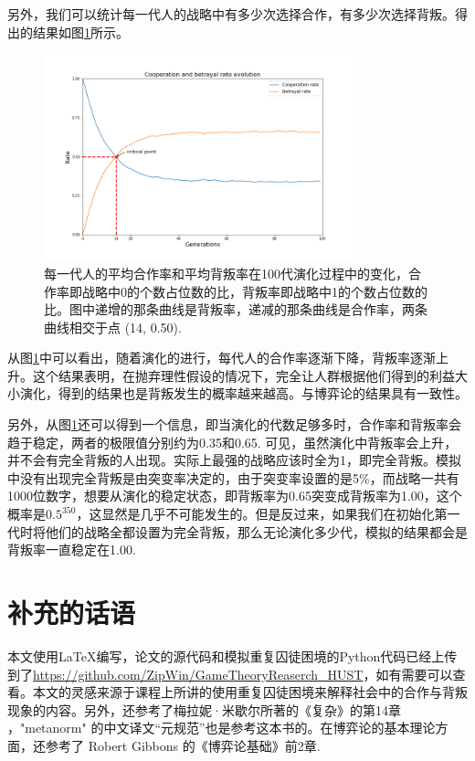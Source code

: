 \documentclass[lang=cn,11pt]{elegantpaper}
\begin{document}
另外，我们可以统计每一代人的战略中有多少次选择合作，有多少次选择背叛。得出的结果如图\ref{fig:cooperation}所示。
\begin{figure}[!htb]
	\centering
	\includegraphics[width=0.8\textwidth]{figure/cooperation.png}
	\caption{ 每一代人的平均合作率和平均背叛率在100代演化过程中的变化，合作率即战略中0的个数占位数的比，背叛率即战略中1的个数占位数的比。图中递增的那条曲线是背叛率，递减的那条曲线是合作率，两条曲线相交于点 (14, 0.50).\label{fig:cooperation}}
\end{figure}
从图\ref{fig:cooperation}中可以看出，随着演化的进行，每代人的合作率逐渐下降，背叛率逐渐上升。这个结果表明，在抛弃理性假设的情况下，完全让人群根据他们得到的利益大小演化，得到的结果也是背叛发生的概率越来越高。与博弈论的结果具有一致性。

另外，从图\ref{fig:cooperation}还可以得到一个信息，即当演化的代数足够多时，合作率和背叛率会趋于稳定，两者的极限值分别约为0.35和0.65. 可见，虽然演化中背叛率会上升，并不会有完全背叛的人出现。实际上最强的战略应该时全为1，即完全背叛。模拟中没有出现完全背叛是由突变率决定的，由于突变率设置的是5\%，而战略一共有1000位数字，想要从演化的稳定状态，即背叛率为0.65突变成背叛率为1.00，这个概率是$0.5^{350}$，这显然是几乎不可能发生的。但是反过来，如果我们在初始化第一代时将他们的战略全都设置为完全背叛，那么无论演化多少代，模拟的结果都会是背叛率一直稳定在1.00.

\section*{补充的话语}
本文使用\LaTeX 编写，论文的源代码和模拟重复囚徒困境的Python代码已经上传到了\url{https://github.com/ZipWin/GameTheoryReaserch\_HUST}，如有需要可以查看。本文的灵感来源于课程上所讲的使用重复囚徒困境来解释社会中的合作与背叛现象的内容。另外，还参考了梅拉妮·米歇尔所著的《复杂》的第14章
\cite{complex}，"metanorm" 的中文译文“元规范”也是参考这本书的。在博弈论的基本理论方面，还参考了 Robert Gibbons 的《博弈论基础》前2章\cite{game}.



\end{document}

